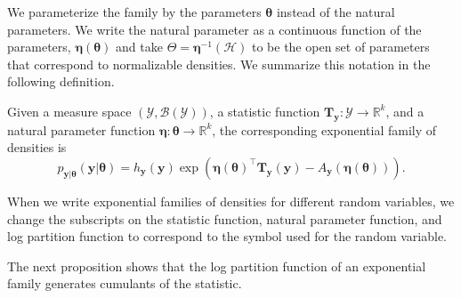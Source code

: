 We parameterize the family by the parameters $\boldsymbol{\theta}$ instead of the natural parameters. We write the natural parameter as a continuous function of the parameters, $\boldsymbol{\eta}(\boldsymbol{\theta})$ and take $\Theta = \boldsymbol{\eta}^{-1}(\mathcal{H})$ to be the open set of parameters that correspond to normalizable densities. We summarize this notation in the following definition.

\begin{definition}
\label{def-exponential-family}
Given a measure space $(\mathcal{Y}, \mathcal{B}(\mathcal{Y}))$, a statistic function $\mathbf{T}_{\mathbf{y}} : \mathcal{Y} \to \mathbb{R}^k$, and a natural parameter function $\boldsymbol{\eta} : \boldsymbol{\theta} \to \mathbb{R}^k$, the corresponding exponential family of densities is
\begin{equation*}
p_{\mathbf{y}\vert\boldsymbol{\theta}}(\mathbf{y} \vert \boldsymbol{\theta}) = h_{\mathbf{y}}(\mathbf{y})   \exp \left( \boldsymbol{\eta}(\boldsymbol{\theta})^{\top} \mathbf{T}_{\mathbf{y}}(\mathbf{y}) - A_{\mathbf{y}}(\boldsymbol{\eta}(\boldsymbol{\theta})) \right).
\end{equation*}
\end{definition}
When we write exponential families of densities for different random variables, we change the subscripts on the statistic function, natural parameter function, and log partition function to correspond to the symbol used for the random variable. 

The next proposition shows that the log partition function of an exponential family generates cumulants of the statistic.

